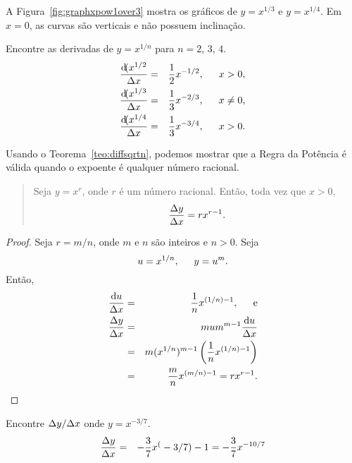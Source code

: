 
A Figura~\ref{fig:graphxpow1over3} mostra os gráficos de $y = x^{1/3}$ e
$y = x^{1/4}$. Em $x = 0$, as curvas são verticais e não possuem inclinação.

\begin{example}
Encontre as derivadas de $y = x^{1/n}$ para $n = 2$, $3$, $4$.
\begin{eqnarray*}
  \frac{\dif(x^{1/2}}{\dx} & = & \frac{1}{2} x^{-1/2}, \hspace{1.5em} x > 0,\\
  \frac{\dif(x^{1/3}}{\dx} & = & \frac{1}{3} x^{-2/3}, \hspace{1.5em} x \ne 0,\\
  \frac{\dif(x^{1/4}}{\dx} & = & \frac{1}{3} x^{-3/4}, \hspace{1.5em} x > 0.
\end{eqnarray*}
\end{example}

Usando o Teorema~\ref{teo:diffsqrtn}, podemos mostrar que a Regra da Potência
é válida quando o expoente é qualquer número racional.


\begin{quote}
  Seja $y = x^r$, onde $r$ é um número racional. Então, toda vez que $x > 0$,
  $$
    \frac{\Delta{y}}{\Delta{x}} = r x^{r-1}.
  $$
\end{quote}

\begin{proof} Seja $r = m/n$, onde $m$ e $n$ são inteiros e $n > 0$. Seja
$$
  u = x^{1/n}, \hspace{1.5em} y = u^m.
$$
Então,
\begin{eqnarray*}
  \frac{\du}{\dx} & = & \frac{1}{n} x^{(1/n)-1}, \hspace{1.5em} \text{e} \\
  \frac{\dy}{\dx} & = & m u m^{m-1} \frac{\du}{\dx} \\
  & = & m(x^{1/n})^{m-1} \left(\frac{1}{n} x^{(1/n)-1} \right) \\
  & = & \frac{m}{n}x^{(m/n)-1} = r x^{r-1}.
\end{eqnarray*}
\end{proof}

\begin{example} Encontre $\Delta{y}/\Delta{x}$ onde $y = x^{-3/7}$.
\begin{eqnarray*}
  \frac{\Delta{y}}{\Delta{x}} & = & -\frac{3}{7}x^(-3/7)-1 = -\frac{3}{7}x^{-10/7}
\end{eqnarray*}
\end{example}

